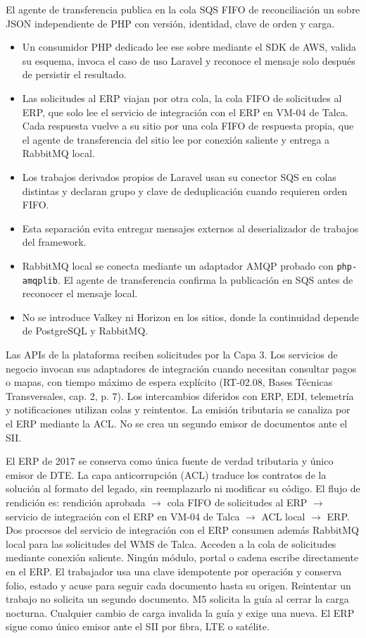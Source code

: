 El agente de transferencia publica en la cola SQS FIFO de reconciliación un sobre JSON independiente de PHP con versión, identidad, clave de orden y carga.

\begin{itemize}
  \item Un consumidor PHP dedicado lee ese sobre mediante el SDK de AWS, valida su esquema, invoca el caso de uso Laravel y reconoce el mensaje solo después de persistir el resultado.
  \item Las solicitudes al ERP viajan por otra cola, la cola FIFO de solicitudes al ERP, que solo lee el servicio de integración con el ERP en VM-04 de Talca. Cada respuesta vuelve a su sitio por una cola FIFO de respuesta propia, que el agente de transferencia del sitio lee por conexión saliente y entrega a RabbitMQ local.
  \item Los trabajos derivados propios de Laravel usan su conector SQS en colas distintas y declaran grupo y clave de deduplicación cuando requieren orden FIFO.
  \item Esta separación evita entregar mensajes externos al deserializador de trabajos del framework.
  \item RabbitMQ local se conecta mediante un adaptador AMQP probado con \texttt{php-amqplib}. El agente de transferencia confirma la publicación en SQS antes de reconocer el mensaje local.
  \item No se introduce Valkey ni Horizon en los sitios, donde la continuidad depende de PostgreSQL y RabbitMQ.
\end{itemize}

Las APIs de la plataforma reciben solicitudes por la Capa 3. Los servicios de negocio invocan sus adaptadores de integración cuando necesitan consultar pagos o mapas, con tiempo máximo de espera explícito (RT-02.08, Bases Técnicas Transversales, cap. 2, p. 7). Los intercambios diferidos con ERP, EDI, telemetría y notificaciones utilizan colas y reintentos. La emisión tributaria se canaliza por el ERP mediante la ACL. No se crea un segundo emisor de documentos ante el SII.

El ERP de 2017 se conserva como única fuente de verdad tributaria y único emisor de DTE. La capa anticorrupción (ACL) traduce los contratos de la solución al formato del legado, sin reemplazarlo ni modificar su código. El flujo de rendición es: rendición aprobada $\rightarrow$ cola FIFO de solicitudes al ERP $\rightarrow$ servicio de integración con el ERP en VM-04 de Talca $\rightarrow$ ACL local $\rightarrow$ ERP. Dos procesos del servicio de integración con el ERP consumen además RabbitMQ local para las solicitudes del WMS de Talca. Acceden a la cola de solicitudes mediante conexión saliente. Ningún módulo, portal o cadena escribe directamente en el ERP. El trabajador usa una clave idempotente por operación y conserva folio, estado y acuse para seguir cada documento hasta su origen. Reintentar un trabajo no solicita un segundo documento. M5 solicita la guía al cerrar la carga nocturna. Cualquier cambio de carga invalida la guía y exige una nueva. El ERP sigue como único emisor ante el SII por fibra, LTE o satélite.

